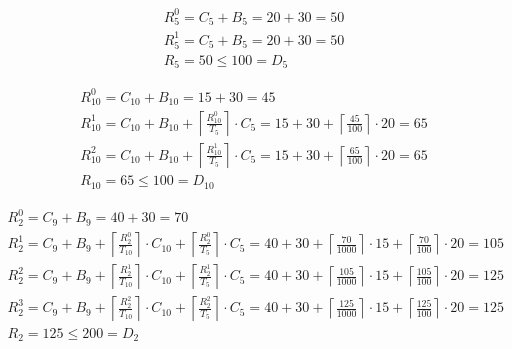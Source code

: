 \begin{gather*}
  R_5^0 = C_5 + B_5 = 20 + 30 = 50 \\
  R_5^1 = C_5 + B_5 = 20 + 30 = 50 \\
  R_5 = 50 \le 100 = D_5
\end{gather*}

\begin{gather*}
  R_{10}^0 = C_{10} + B_{10} = 15 + 30 = 45 \\
  R_{10}^1 = C_{10} + B_{10} + \left\lceil\frac{R_{10}^0}{T_5}\right\rceil\cdot C_5 = 15 + 30 + \left\lceil\frac{45}{100}\right\rceil\cdot 20 = 65 \\
  R_{10}^2 = C_{10} + B_{10} + \left\lceil\frac{R_{10}^1}{T_5}\right\rceil\cdot C_5 = 15 + 30 + \left\lceil\frac{65}{100}\right\rceil\cdot 20 = 65 \\
  R_{10} = 65 \le 100 = D_{10}
\end{gather*}

\begin{gather*}
  R_2^0 = C_9 + B_9 = 40 + 30 = 70 \\
  R_2^1 = C_9 + B_9 + \left\lceil\frac{R_2^0}{T_{10}}\right\rceil\cdot C_{10} + \left\lceil\frac{R_2^0}{T_5}\right\rceil\cdot C_5 = 40 + 30 + \left\lceil\frac{70}{1000}\right\rceil\cdot 15 + \left\lceil\frac{70}{100}\right\rceil\cdot 20 = 105 \\
  R_2^2 = C_9 + B_9 + \left\lceil\frac{R_2^1}{T_{10}}\right\rceil\cdot C_{10} + \left\lceil\frac{R_2^1}{T_5}\right\rceil\cdot C_5 = 40 + 30 + \left\lceil\frac{105}{1000}\right\rceil\cdot 15 + \left\lceil\frac{105}{100}\right\rceil\cdot 20 = 125 \\
  R_2^3 = C_9 + B_9 + \left\lceil\frac{R_2^2}{T_{10}}\right\rceil\cdot C_{10} + \left\lceil\frac{R_2^2}{T_5}\right\rceil\cdot C_5 = 40 + 30 + \left\lceil\frac{125}{1000}\right\rceil\cdot 15 + \left\lceil\frac{125}{100}\right\rceil\cdot 20 = 125 \\
  R_2 = 125 \le 200 = D_2
\end{gather*}


